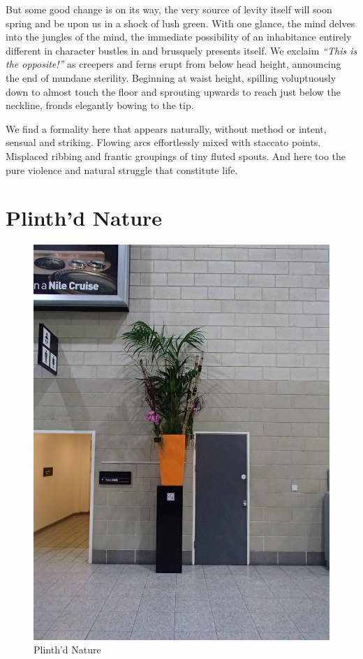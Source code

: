 \documentclass{book}
\begin{document}
But some good change is on its way, the very source of levity itself will soon
spring and be upon us in a shock of lush green. With one glance, the mind
delves into the jungles of the mind, the immediate possibility of an
inhabitance entirely different in character bustles in and brusquely presents
itself. We exclaim \emph{``This is the opposite!''} as creepers and ferns erupt
from below head height, announcing the end of mundane sterility. Beginning at
waist height, spilling voluptuously down to almost touch the floor and
sprouting upwards to reach just below the neckline, fronds elegantly bowing to
the tip.

We find a formality here that appears naturally, without method or intent,
sensual and striking. Flowing arcs effortlessly mixed with staccato points.
Misplaced ribbing and frantic groupings of tiny fluted spouts. And here too
the pure violence and natural struggle that constitute life.

\chapter{Plinth'd Nature}

\begin{figure}
\centering
\includegraphics[width=\textwidth,angle=90]{figures/P1050143.JPG}
\caption{Plinth'd Nature}
\end{figure}
\end{document}
